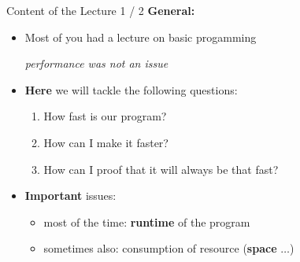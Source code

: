 \documentclass[notes=hide,pdftex,14pt]{beamer}
\begin{document}
\begin{frame}{Content of the Lecture 1 / 2}
  \textbf{General:}
  \begin{itemize}
    \item Most of you had a lecture on basic progamming
      \begin{center}
        \textit{performance was not an issue}
      \end{center}
\vspace*{1em}
    \item<2->
      \textbf{Here} we will tackle the following questions:
      \begin{enumerate}
        \item<3->
          How fast is our program?
        \item<4->
          How can I make it faster?
        \item<5->
          How can I proof that it will always be that fast?
      \end{enumerate}
\vspace*{1em}    \item<6->
      \textbf{Important} issues:
      \begin{itemize}
        \item
          most of the time: \textbf{runtime} of the program
        \item sometimes also:  consumption of resource (\textbf{space} $\ldots$)
      \end{itemize}
  \end{itemize}
\end{frame}

\end{document}
